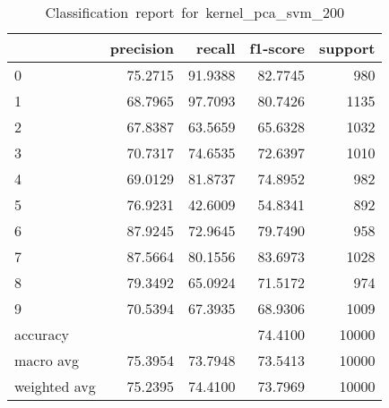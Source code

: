 \begin{table}[htb!]
    \centering
    \begin{tabular}{lrrrr}
        \toprule
                     & precision & recall  & f1-score & support \\
        \midrule
        0            & 75.2715   & 91.9388 & 82.7745  & 980     \\
        1            & 68.7965   & 97.7093 & 80.7426  & 1135    \\
        2            & 67.8387   & 63.5659 & 65.6328  & 1032    \\
        3            & 70.7317   & 74.6535 & 72.6397  & 1010    \\
        4            & 69.0129   & 81.8737 & 74.8952  & 982     \\
        5            & 76.9231   & 42.6009 & 54.8341  & 892     \\
        6            & 87.9245   & 72.9645 & 79.7490  & 958     \\
        7            & 87.5664   & 80.1556 & 83.6973  & 1028    \\
        8            & 79.3492   & 65.0924 & 71.5172  & 974     \\
        9            & 70.5394   & 67.3935 & 68.9306  & 1009    \\
        accuracy     &           &         & 74.4100  & 10000   \\
        macro avg    & 75.3954   & 73.7948 & 73.5413  & 10000   \\
        weighted avg & 75.2395   & 74.4100 & 73.7969  & 10000   \\
        \bottomrule
    \end{tabular}
    \caption{Classification\ report\ for\ kernel\_pca\_svm\_200}
    \label{tab:classification-report-kernel_pca_svm_200}
\end{table}
